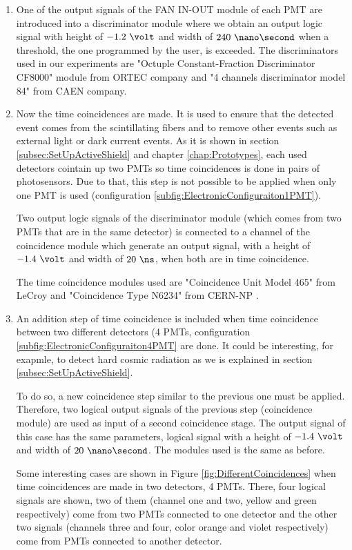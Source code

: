 \begin{itemize}
\begin{enumerate}
\item{} One of the output signals of the FAN IN-OUT module of each PMT are introduced into a discriminator module where we obtain an output logic signal with height of $-1.2~\volt$ and width of $240~\nano\second$ when a threshold, the one programmed by the user, is exceeded. The discriminators used in our experiments are  "Octuple Constant-Fraction Discriminator CF8000" module from ORTEC company \cite{DataSheetDiscriminator} and "4 channels discriminator model 84" from CAEN company. 

\item{} Now the time coincidences are made. It is used to ensure that the detected event comes from the scintillating fibers and to remove other events such as external light or dark current events. As it is shown in section \ref{subsec:SetUpActiveShield} and chapter \ref{chap:Prototypes}, each used detectors cointain up two PMTs so time coincidences is done in pairs of photosensors. Due to that, this step is not possible to be applied when only one PMT is used (configuration \ref{subfig:ElectronicConfiguraiton1PMT}). 

Two output logic signals of the discriminator module (which comes from two PMTs that are in the same detector) is connected to a channel of the coincidence module which generate an output signal, with a height of $-1.4~\volt$ and width of $20~\ns$, when both are in time coincidence.

The time coincidence modules used are "Coincidence Unit Model 465" from LeCroy \cite{DataSheetCoincidenceLeCroy} and "Coincidence Type N6234" from CERN-NP \cite{DataSheetCoincidenceCERN}.

\item{} An addition step of time coincidence is included when time coincidence between two different detectors (4 PMTs, configuration \ref{subfig:ElectronicConfiguraiton4PMT} are done. It could be interesting, for exapmle, to detect hard cosmic radiation as we is explained in section \ref{subsec:SetUpActiveShield}.

To do so, a new coincidence step similar to the previous one must be applied. Therefore, two logical output signals of the previous step (coincidence module) are used as input of a second coincidence stage. The output signal of this case has the same parameters, logical signal with a height of $-1.4~\volt$ and width of $20~\nano\second$. The modules used is the same as before.

Some interesting cases  are shown in Figure \ref{fig:DifferentCoincidences} when time coincidences are made in two detectors, 4 PMTs. There, four logical signals are shown, two of them (channel one and two, yellow and green respectively) come from two PMTs connected to one detector and the other two signals (channels three and four, color orange and violet respectively) come from PMTs connected to another detector.


\end{enumerate}
\end{itemize}
